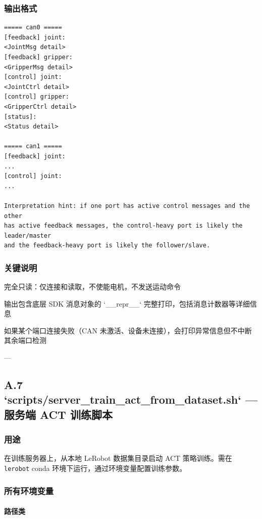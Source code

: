 \documentclass[UTF8,a4paper,11pt]{ctexart}
\begin{document}
{\subsubsection{输出格式}

\begin{lstlisting}[language=text]
===== can0 =====
[feedback] joint:
<JointMsg detail>
[feedback] gripper:
<GripperMsg detail>
[control] joint:
<JointCtrl detail>
[control] gripper:
<GripperCtrl detail>
[status]:
<Status detail>

===== can1 =====
[feedback] joint:
...
[control] joint:
...

Interpretation hint: if one port has active control messages and the other
has active feedback messages, the control-heavy port is likely the leader/master
and the feedback-heavy port is likely the follower/slave.
\end{lstlisting}

\subsubsection{关键说明}

\item 完全只读：仅连接和读取，不使能电机，不发送运动命令
\item 输出包含底层 SDK 消息对象的 `__repr__` 完整打印，包括消息计数器等详细信息
\item 如果某个端口连接失败（CAN 未激活、设备未连接），会打印异常信息但不中断其余端口检测

---

\subsection{A.7 `scripts/server_train_act_from_dataset.sh` — 服务端 ACT 训练脚本}

\subsubsection{用途}

在训练服务器上，从本地 LeRobot 数据集目录启动 ACT 策略训练。需在 \texttt{lerobot} conda 环境下运行，通过环境变量配置训练参数。

\subsubsection{所有环境变量}

\paragraph{路径类}


}
\end{document}
